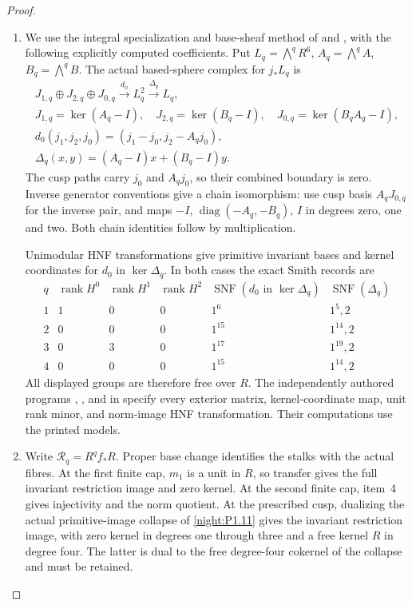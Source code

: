 \begin{proof}
\begin{enumerate}[label=\arabic*.]
\item We use the integral specialization and base-sheaf method
of \cite[Lemma~7.25 and Propositions~7.26--7.27, pp.~61--63]{AC26}
and \cite[section ``The integral homology'']{E26}, with the
following explicitly computed coefficients.  Put
$L_q=\bigwedge^qR^6$, $A_q=\bigwedge^qA$, $B_q=\bigwedge^qB$.
The actual based-sphere complex for $j_*L_q$ is
\[
\begin{gathered}
 J_{1,q}\oplus J_{2,q}\oplus J_{0,q}
 \xrightarrow{d_0} L_q^2\xrightarrow{\Delta_q}L_q,\\
 J_{1,q}=\ker(A_q-I),\quad J_{2,q}=\ker(B_q-I),\quad
 J_{0,q}=\ker(B_qA_q-I),\\
 d_0(j_1,j_2,j_0)=(j_1-j_0,j_2-A_qj_0),\\
 \Delta_q(x,y)=(A_q-I)x+(B_q-I)y.
\end{gathered}
\]
The cusp paths carry $j_0$ and $A_qj_0$, so their combined
boundary is zero.  Inverse generator conventions give a chain
isomorphism: use cusp basis $A_qJ_{0,q}$ for the inverse pair,
and maps $-I$, $\operatorname{diag}(-A_q,-B_q)$, $I$ in degrees
zero, one and two.  Both chain identities follow by multiplication.

Unimodular HNF transformations give primitive invariant bases
and kernel coordinates for $d_0$ in $\ker\Delta_q$.  In both cases
the exact Smith records are
\[
\begin{array}{c|ccc|c|c}
q&\operatorname{rank}H^0&\operatorname{rank}H^1&\operatorname{rank}H^2
 &\operatorname{SNF}(d_0\text{ in }\ker\Delta_q)
 &\operatorname{SNF}(\Delta_q)\\\hline
1&1&0&0&1^6&1^5,2\\
2&0&0&0&1^{15}&1^{14},2\\
3&0&3&0&1^{17}&1^{19},2\\
4&0&0&0&1^{15}&1^{14},2
\end{array}
\]
All displayed groups are therefore free over $R$.  The independently
authored programs
,
, and 
in  specify every exterior matrix,
kernel-coordinate map, unit rank minor, and norm-image HNF
transformation.  Their computations use the printed models.

\item Write $\mathcal R_q=R^qf_*R$.  Proper base change
\cite[Tag~09V5, Lemma~20.18.1]{StacksProject} identifies the stalks
with the actual fibres.  At the first finite cap, $m_1$ is a
unit in $R$, so transfer gives the full invariant restriction
image and zero kernel.  At the second finite cap, item~4 gives
injectivity and the norm quotient.  At the prescribed cusp,
dualizing the actual primitive-image collapse of
\cref{night:P1.11} gives the invariant restriction image, with
zero kernel in degrees one through three and a free kernel $R$
in degree four.  The latter is dual to the free degree-four
cokernel of the collapse and must be retained.


\end{enumerate}
\end{proof}
